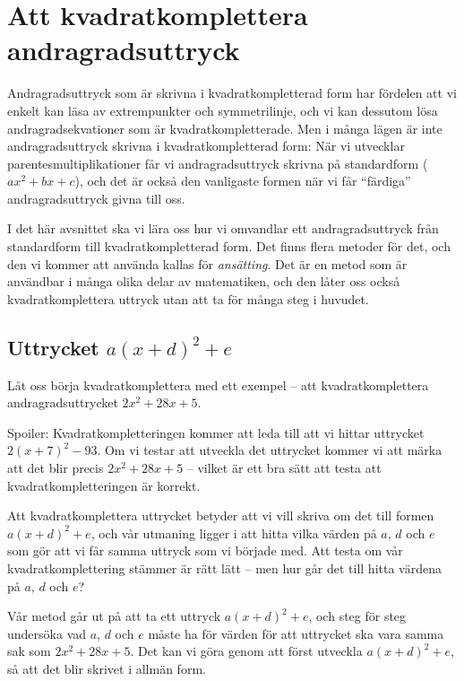 \section{Att kvadratkomplettera andragradsuttryck}

Andragradsuttryck som är skrivna i kvadratkompletterad form har fördelen att vi enkelt kan läsa av extrempunkter och symmetrilinje, och vi kan dessutom lösa andragradsekvationer som är kvadratkompletterade.
Men i många lägen är inte andragradsuttryck skrivna i kvadratkompletterad form:
När vi utvecklar parentesmultiplikationer får vi andragradsuttryck skrivna på standardform ($ax^2+bx+c$), och det är också den vanligaste formen när vi får ``färdiga'' andragradsuttryck givna till oss.

I det här avsnittet ska vi lära oss hur vi omvandlar ett andragradsuttryck från standardform till kvadratkompletterad form.
Det finns flera metoder för det, och den vi kommer att använda kallas för \emph{ansätting}.
Det är en metod som är användbar i många olika delar av matematiken, och den låter oss också kvadratkomplettera uttryck utan att ta för många steg i huvudet.

\subsection{Uttrycket $a(x+d)^2+e$}

Låt oss börja kvadratkomplettera med ett exempel -- att kvadratkomplettera andragradsuttrycket $2x^2+28x+5$.

Spoiler: Kvadratkompletteringen kommer att leda till att vi hittar uttrycket $2(x+7)^2-93$.
Om vi testar att utveckla det uttrycket kommer vi att märka att det blir precis $2x^2+28x+5$ -- vilket är ett bra sätt att testa att kvadratkompletteringen är korrekt.

Att kvadratkomplettera uttrycket betyder att vi vill skriva om det till formen $a(x+d)^2+e$, och vår utmaning ligger i att hitta vilka värden på $a$, $d$ och $e$ som gör att vi får samma uttryck som vi började med.
Att testa om vår kvadratkomplettering stämmer är rätt lätt -- men hur går det till hitta värdena på $a$, $d$ och $e$?

Vår metod går ut på att ta ett uttryck $a(x+d)^2+e$, och steg för steg undersöka vad $a$, $d$ och $e$ måste ha för värden för att uttrycket ska vara samma sak som $2x^2+28x+5$.
Det kan vi göra genom att först utveckla $a(x+d)^2+e$, så att det blir skrivet i allmän form.

